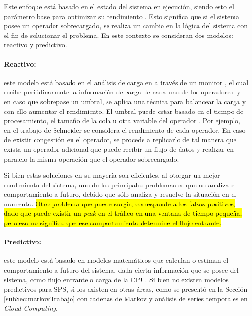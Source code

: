 Este enfoque está basado en el estado del sistema en ejecución, siendo esto el parámetro base para optimizar su rendimiento \citep{CasavantK88}. Esto significa que si el sistema posee un operador sobrecargado, se realiza un cambio en la lógica del sistema con el fin de solucionar el problema. En este contexto se consideran dos modelos: reactivo y predictivo.

\paragraph{Reactivo:} este modelo está basado en el análisis de carga en a través de un monitor \citep{GulisanoJPSV12}, el cual recibe periódicamente la información de carga de cada uno de los operadores, y en caso que sobrepase un umbral, se aplica una técnica para balancear la carga y con ello aumentar el rendimiento. El umbral puede estar basado en el tiempo de procesamiento, el tamaño de la cola u otra variable del operador \citep{BhuvanagiriGKS06}. Por ejemplo, en el trabajo de Schneider \citep{SchneiderAGBW09} se considera el rendimiento de cada operador. En caso de existir congestión en el operador, se procede a replicarlo de tal manera que exista un operador adicional que puede recibir un flujo de datos y realizar en paralelo la misma operación que el operador sobrecargado.

Si bien estas soluciones en su mayoría son eficientes, al otorgar un mejor rendimiento del sistema, uno de los principales problemas es que no analiza el comportamiento a futuro, debido que sólo analiza y resuelve la situación en el momento. \hl{Otro problema que puede surgir, corresponde a los falsos positivos, dado que puede existir un \textit{peak} en el tráfico en una ventana de tiempo pequeña, pero eso no significa que ese comportamiento determine el flujo entrante.}

\paragraph{Predictivo:} este modelo está basado en modelos matemáticos que calculan o estiman el comportamiento a futuro del sistema, dada cierta información que se posee del sistema, como flujo entrante o carga de la CPU. Si bien no existen modelos predictivos para SPS, si los existen en otras áreas, como se presentó en la Sección \ref{subSec:markovTrabajo} con cadenas de Markov y análisis de series temporales en \textit{Cloud Computing}.

